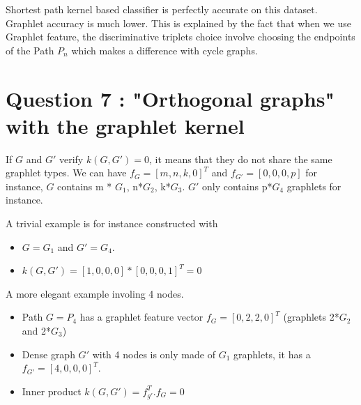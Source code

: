 \documentclass[a4paper]{article}
\begin{document}
Shortest path kernel based classifier is perfectly accurate on this dataset. Graphlet accuracy is much lower.
This is explained by the fact that when we use Graphlet feature, the discriminative triplets choice
involve choosing the endpoints of the Path $P_n$ which makes a difference with cycle graphs.


\section{Question 7 : "Orthogonal graphs" with the graphlet kernel}
If $G$ and $G'$ verify $k(G,G')=0$, it means that they do not share the same graphlet types.
We can have $f_G = [m, n, k, 0]^T$ and $f_{G'} = [0, 0, 0, p]$ for instance, $G$ contains m * $G_1$, n*$G_2$, k*$G_3$.
$G'$ only contains p*$G_4$ graphlets for instance.

A trivial example is for instance constructed with
\begin{itemize}
    \item $G=G_1$ and $G'=G_4$. 
    \item $k(G,G')=[1, 0, 0, 0]*[0, 0, 0, 1]^T = 0$
\end{itemize}
A more elegant example involing 4 nodes.
\begin{itemize}
    \item Path $G=P_4$ has a graphlet feature vector $f_G=[0, 2, 2, 0]^T$ (graphlets 2*$G_2$ and 2*$G_3$)
    \item Dense graph $G'$ with 4 nodes is only made of $G_1$ graphlets, it has a  $f_{G'}=[4, 0, 0, 0]^T$.
    \item Inner product $k(G, G') = f_{g'}^T.f_G = 0$ 
\end{itemize}

% 
% 
\end{document}
